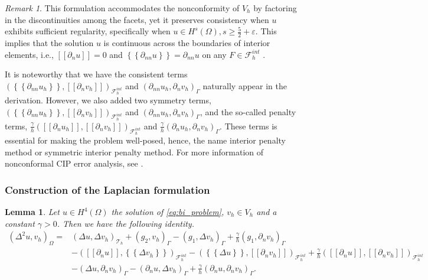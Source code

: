 \documentclass[11pt]{article}
\newtheorem{lemma}[theorem]{Lemma}
\theoremstyle{remark}
\newtheorem*{remark}{Remark}
\newcommand{\mean}[1]{\left\{\!\!\left\{#1\right\}\!\!\right\}}
\newcommand{\jump}[1]{\left[\!\left[ #1 \right]\!\right]}
\renewcommand{\ge}{\geqslant}
\numberwithin{equation}{section}
\begin{document}
\begin{remark}
    This formulation accommodates the nonconformity of $V_{h}$ by factoring in the discontinuities among the facets, yet it preserves consistency when $u$ exhibits sufficient regularity, specifically when $u\in H^{s}( \Omega ), s\ge \frac{5}{2} +
\varepsilon $. This implies that the solution $u$  is continuous across the boundaries of interior elements, i.e.,  $\jump{ \partial _{n} u }   = 0 $ and  $\mean{ \partial _{nn} u }   = \partial _{nn} u $ on any $ F \in \mathcal{F} ^{int}_{h} $ .

It is noteworthy that we have the consistent terms $\left( \mean{  \partial _{n n} u_{h} }, \jump{ \partial _{n }v_{h}} \right)_{\mathcal{F}_{h}^{int}} $ and $ \left(   \partial _{n n} u_{h} ,  \partial _{n }v_h \right)_{\Gamma }$ naturally appear in the
derivation. However, we also added two symmetry terms,  $\left( \mean{  \partial _{n n} u_{h} }, \jump{ \partial _{n }v_{h}}
\right)_{\mathcal{F}_{h}^{int}} $ and $ \left(   \partial _{n n} u_{h} ,  \partial _{n }v_{h} \right)_{\Gamma }$, and the so-called penalty terms, $ \frac{\gamma }{h}  \left( \jump{ \partial _{n} u_{h}}, \jump{ \partial _{n} v_{h}   }   \right)_{\mathcal{F}_{h}^{int}}$ and $ \frac{\gamma }{h}  \left(  \partial _{n} u_{h},  \partial _{n} v_{h}      \right)_{\Gamma }$.
     These terms is essential for making the problem well-posed, hence, the name interior penalty method or symmetric interior penalty method. For more information of  nonconformal CIP error analysis, see \cite[Chapter 1.3]{pietro2012}.
\end{remark}

\subsubsection{Construction of the Laplacian formulation}%
\label{ssub:construction_of_the_laplacian_formulation}


\begin{lemma}

 Let $u \in H^{4}( \Omega ) $ the solution of \eqref{eq:bi_problem}, $v_{h} \in  V_{h}$ and a constant $\gamma >0$. Then we have the following identity.
\[
    \begin{split}
( \Delta ^2 u, v_{h} ) _{\Omega }  =& ( \Delta u, \Delta v_{h})_{\mathcal{T} _{h} }  + ( g_{2} , v_{h} )_{\Gamma }  - ( g_{1} , \Delta v_{h})_{\Gamma } + \frac{\gamma }{h} ( g_{1} ,  \partial _{n}v_{h})_{\Gamma }\\
& -  ( \jump{ \partial _{n} u} , \mean{ \Delta v_{h} })_{\mathcal{F}_{h}^{int} }-  (  \mean{ \Delta u }, \jump{ \partial _{n} v_{h}} )_{\mathcal{F}_{h}^{int} } + \frac{\gamma }{h}  \left( \jump{ \partial _{n} u}, \jump{ \partial _{n} v_{h}   }
\right)_{\mathcal{F}_{h}^{int} } \\
& - (  \Delta u, \partial _{n} v_{h})_{\Gamma }- ( \partial _{n} u, \Delta v_{h})_{\Gamma } + \frac{\gamma }{h}( \partial _{n} u, \partial _{n} v_{h})_{\Gamma }   .
    \end{split}
\]
\end{lemma}
\end{document}
